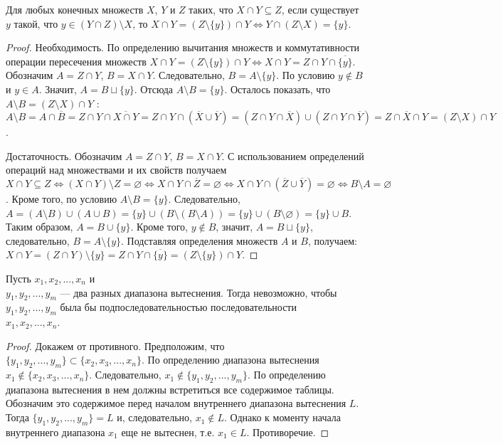 \begin{lemma}
Для любых конечных множеств $X$, $Y$ и $Z$ таких, что $X \cap Y
\subseteq Z$, если существует $y$ такой, что $y \in (Y \cap
Z)\setminus X$, то $X \cap Y = (Z \setminus \{y\}) \cap Y
\Leftrightarrow Y \cap ( Z \setminus X ) = \{ y \}$.
\end{lemma}
\begin{proof}
Необходимость. По определению вычитания множеств и коммутативности
операции пересечения множеств $X \cap Y = (Z \setminus \{y\}) \cap Y
\Leftrightarrow X \cap Y = Z \cap Y \cap \overline{\{y\}}$.
Обозначим $A = Z \cap Y$, $B = X \cap Y$. Следовательно, $B = A
\setminus \{y\}$. По условию $y \notin B$ и $y \in A$. Значит, $A =
B \sqcup \{y\}$. Отсюда $A \setminus B = \{y\}$. Осталось показать,
что $A \setminus B = (Z \setminus X ) \cap Y$ : $A \setminus B = A
\cap \overline{B} = Z \cap Y \cap \overline{X \cap Y} = Z \cap Y
\cap (\overline{X} \cup \overline{Y}) = (Z \cap Y \cap \overline{X})
\cup (Z \cap Y \cap \overline{Y}) = Z \cap \overline{X} \cap Y = (Z
\setminus X ) \cap Y$.

Достаточность. Обозначим $A = Z \cap Y$, $B = X \cap Y$. С
использованием определений операций над множествами и их свойств
получаем $X \cap Y \subseteq Z \Leftrightarrow (X \cap Y) \setminus
Z = \varnothing \Leftrightarrow X \cap Y \cap \overline{Z} =
\varnothing \Leftrightarrow X \cap Y \cap (\overline{Z} \cup
\overline{Y}) = \varnothing \Leftrightarrow B \setminus A =
\varnothing$. Кроме того, по условию $A \setminus B = \{y\}$.
Следовательно, $A = (A \setminus B) \cup (A \cup B) = \{y\} \cup (B
\setminus (B \setminus A)) = \{y\} \cup (B \setminus \varnothing) =
\{y\} \cup B$. Таким образом, $A = B \cup \{y\}$. Кроме того, $y
\notin B$, значит, $A = B \sqcup \{y\}$, следовательно, $B = A
\setminus \{y\}$. Подставляя определения множеств $A$ и $B$,
получаем: $X \cap Y = (Z \cap Y) \setminus \{y\} = Z \cap Y \cap
\overline{\{y\}} = (Z \setminus \{y\}) \cap Y$.
\end{proof}

\begin{lemma}\label{includedranges}
  Пусть $x_1, x_2, ..., x_n$ и\\ $y_1, y_2, ..., y_m$ --- два разных
  диапазона вытеснения. Тогда невозможно, чтобы $y_1, y_2,
  ..., y_m$ была бы подпоследовательностью последовательности\\ $x_1,
  x_2, ..., x_n$.
\end{lemma}
\begin{proof}
  Докажем от противного. Предположим, что\\ $\{y_1, y_2, ..., y_m\}
  \subset \{x_2, x_3, ..., x_n\}$. По определению диапазона
  вытеснения $x_1 \notin \{x_2, x_3, ..., x_n\}$. Следовательно,
  $x_1 \notin \{y_1, y_2, ..., y_m\}$. По определению диапазона
  вытеснения в нем должны встретиться все содержимое таблицы. Обозначим это содержимое перед началом внутреннего
  диапазона вытеснения $L$. Тогда $\{y_1, y_2, ..., y_m\} = L$ и,
  следовательно, $x_1 \notin L$. Однако к моменту начала внутреннего
  диапазона $x_1$ еще не вытеснен, т.е. $x_1 \in L$. Противоречие.
\end{proof}

